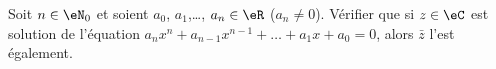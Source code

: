 \begin{exercice}\label{exoJanvier003}

Soit $n\in\eN_0$ et soient $a_0$, $a_1$,\ldots, $a_n\in\eR$ ($a_n\neq 0$). Vérifier que si $z\in\eC$ est solution de l'équation $a_nx^n+a_{n-1}x^{n-1}+\ldots+a_1x+a_0=0$, alors $\bar z$ l'est également.

\end{exercice}
